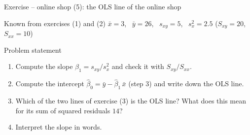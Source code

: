 \documentclass[aspectratio=169,11pt]{beamer}
\begin{document}
\begin{frame}{Exercise -- online shop (5): the OLS line of the online shop}
  \begin{block}{Known from exercises (1) and (2)}
    $\bar{x} = 3$, \ $\bar{y} = 26$, \ $s_{xy} = 5$, \ $s_x^{2} = 2.5$
    \qquad ($S_{xy} = 20$, \ $S_{xx} = 10$)
  \end{block}

  \medskip

  \begin{block}{Problem statement}
    \begin{enumerate}
      \setlength{\itemsep}{3pt}
      \item Compute the slope $\hat{\beta}_1 = s_{xy}/s_x^{2}$ and check it with
            $S_{xy}/S_{xx}$.
      \item Compute the intercept $\hat{\beta}_0 = \bar{y} - \hat{\beta}_1\,\bar{x}$
            (step 3) and write down the OLS line.
      \item Which of the two lines of exercise (3) is the OLS line? What does
            this mean for its sum of squared residuals $14$?
      \item Interpret the slope in words.
    \end{enumerate}
  \end{block}
\end{frame}
\end{document}
